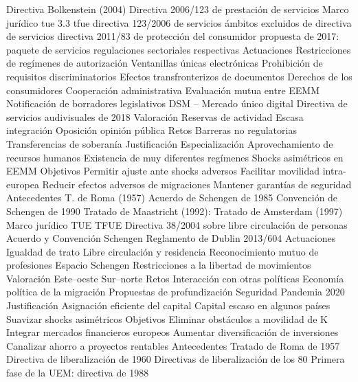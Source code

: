 \documentclass{nuevotema}
\begin{document}
\begin{esquema}[enumerate]
			\3 Directiva Bolkenstein (2004)
			\3 Directiva 2006/123 de prestación de servicios
		\2 Marco jurídico
			\3 tue 3.3
			\3 tfue
			\3 directiva 123/2006 de servicios
			\3 ámbitos excluidos de directiva de servicios
			\3 directiva 2011/83 de protección del consumidor
			\3 propuesta de 2017: paquete de servicios
			\3 regulaciones sectoriales respectivas
		\2 Actuaciones
			\3 Restricciones de regímenes de autorización
			\3 Ventanillas únicas electrónicas
			\3 Prohibición de requisitos discriminatorios
			\3 Efectos transfronterizos de documentos
			\3 Derechos de los consumidores
			\3 Cooperación administrativa
			\3 Evaluación mutua entre EEMM
			\3 Notificación de borradores legislativos
			\3 DSM -- Mercado único digital
			\3 Directiva de servicios audivisuales de 2018
		\2 Valoración
			\3 Reservas de actividad
			\3 Escasa integración
			\3 Oposición opinión pública
		\2 Retos
			\3 Barreras no regulatorias
			\3 Transferencias de soberanía
	\1 
		\2 Justificación
			\3 Especialización
			\3 Aprovechamiento de recursos humanos
			\3 Existencia de muy diferentes regímenes
			\3 Shocks asimétricos en EEMM
		\2 Objetivos
			\3 Permitir ajuste ante shocks adversos
			\3 Facilitar movilidad intra-europea
			\3 Reducir efectos adversos de migraciones
			\3 Mantener garantías de seguridad
		\2 Antecedentes
			\3 T. de Roma (1957)
			\3 Acuerdo de Schengen de 1985
			\3 Convención de Schengen de 1990
			\3 Tratado de Maastricht (1992):
			\3 Tratado de Amsterdam (1997)
		\2 Marco jurídico
			\3 TUE
			\3 TFUE
			\3 Directiva 38/2004 sobre libre circulación de personas
			\3 Acuerdo y Convención Schengen
			\3 Reglamento de Dublin 2013/604
		\2 Actuaciones
			\3 Igualdad de trato
			\3 Libre circulación y residencia
			\3 Reconocimiento mutuo de profesiones
			\3 Espacio Schengen
			\3 Restricciones a la libertad de movimientos
		\2 Valoración
			\3 Este--oeste
			\3 Sur--norte
		\2 Retos
			\3 Interacción con otras políticas
			\3 Economía política de la migración
			\3 Propuestas de profundización
			\3 Seguridad
			\3 Pandemia 2020
	\1 
		\2 Justificación
			\3 Asignación eficiente del capital
			\3 Capital escaso en algunos países
			\3 Suavizar shocks asimétricos
		\2 Objetivos
			\3 Eliminar obstáculos a movilidad de K
			\3 Integrar mercados financieros europeos
			\3 Aumentar diversificación de inversiones
			\3 Canalizar ahorro a proyectos rentables
		\2 Antecedentes
			\3 Tratado de Roma de 1957
			\3 Directiva de liberalización de 1960
			\3 Directivas de liberalización de los 80
			\3 Primera fase de la UEM: directiva de 1988

\end{esquema}
\end{document}
